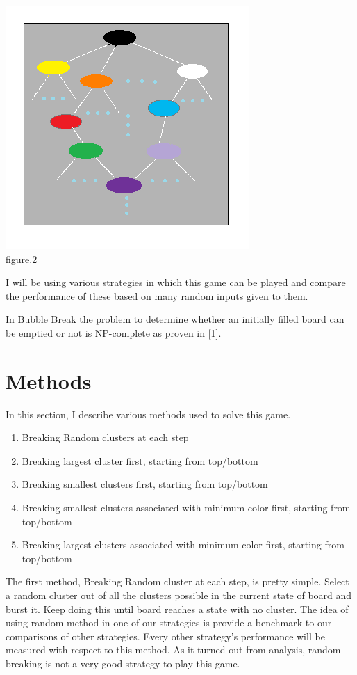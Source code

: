\documentclass[twoside]{article}
\begin{document}
\begin{multicols}{2}
\begin{center}
    \includegraphics[scale=0.25]{tree.png}
    \\
    figure.2 
\end{center}

I will be using various strategies in which this game can be played and compare the performance of
these based on many random inputs given to them.

In Bubble Break the problem to determine whether an initially filled board can be emptied or not is NP-complete as proven in [1].


\section{Methods}

In this section, I describe various methods used to solve this game.
\begin{enumerate}
\item Breaking Random clusters at each step
\item Breaking largest cluster first, starting from top/bottom
\item Breaking smallest clusters first, starting from top/bottom
\item Breaking smallest clusters associated with minimum color first, starting from top/bottom
\item Breaking largest clusters associated with minimum color first, starting from top/bottom
\end{enumerate}

The first method, Breaking Random cluster at each step, is pretty simple. Select a random cluster out of all the clusters possible
in the current state of board and burst it. Keep doing this until board reaches a state with no cluster. The idea of using random 
method in one of our strategies is provide a benchmark to our comparisons of other strategies. Every other strategy's performance
will be measured with respect to this method. As it turned out from analysis, random breaking is not a very good strategy to play
this game.


\end{multicols}
\end{document}
